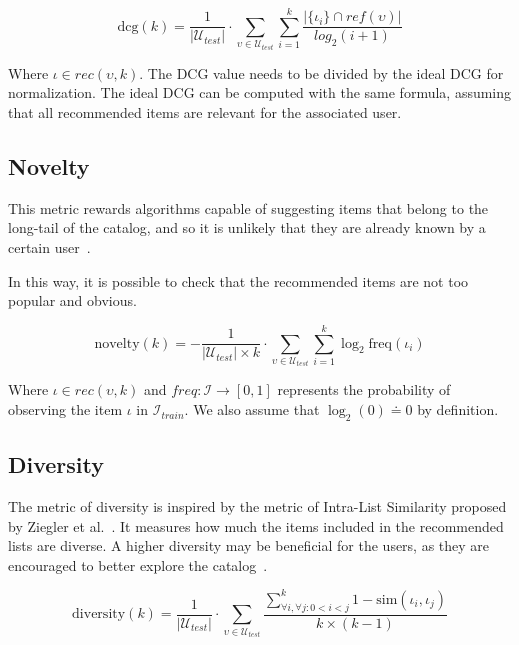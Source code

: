 \begin{equation*}
\mathrm{dcg}(k) = \frac{1}{|\mathcal{U}_{test}|} \cdot \sum_{\upsilon \in \mathcal{U}_{test}} \sum_{i = 1}^{k} \frac{|\{\iota_i\} \cap ref(\upsilon)|}{log_2(i + 1)}
\end{equation*}

Where $\iota \in rec(\upsilon, k)$. The DCG value needs to be divided by the ideal DCG for normalization. The ideal DCG can be computed with the same formula, assuming that all recommended items are relevant for the associated user.

\subsection{Novelty}
This metric rewards algorithms capable of suggesting items that belong to the long-tail of the catalog, and so it is unlikely that they are already known by a certain user~\cite{Vargas2011}.

In this way, it is possible to check that the recommended items are not too popular and obvious.

\begin{equation*}
\mathrm{novelty}(k) = - \frac{1}{|\mathcal{U}_{test}| \times k} \cdot \sum_{\upsilon \in \mathcal{U}_{test}} \sum_{i = 1}^{k} \log_2 \mathrm{freq}(\iota_i)
\end{equation*}

Where $\iota \in rec(\upsilon, k)$ and $freq : \mathcal{I} \to [0, 1]$ represents the probability of observing the item $\iota$ in $\mathcal{I}_{train}$. We also assume that $\log_2(0) \doteq 0$ by definition.

\subsection{Diversity}
The metric of diversity is inspired by the metric of Intra-List Similarity proposed by Ziegler et al.~\cite{Ziegler2005}. It measures how much the items included in the recommended lists are diverse. A higher diversity may be beneficial for the users, as they are encouraged to better explore the catalog~\cite{Noia2014}.

\begin{equation*}
\mathrm{diversity}(k) = \frac{1}{|\mathcal{U}_{test}|} \cdot \sum_{\upsilon \in \mathcal{U}_{test}} \frac{\sum_{\forall{i}, \forall{j} : 0 < i < j}^k 1 - \mathrm{sim}(\iota_i, \iota_j)}{k \times (k - 1)}
\end{equation*}

